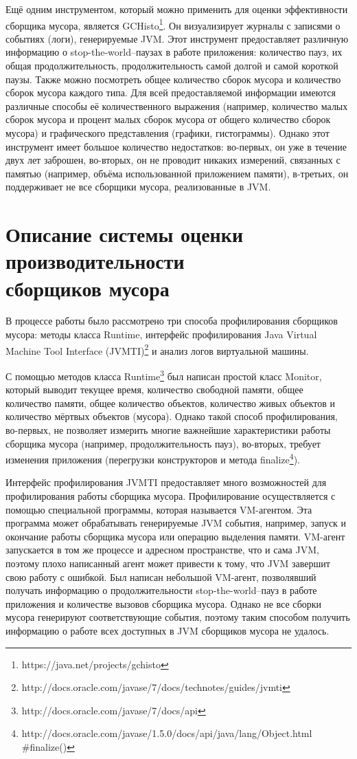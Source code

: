 Ещё одним инструментом, который можно применить для оценки эффективности сборщика мусора,
является GCHisto\footnote{https://java.net/projects/gchisto}. Он визуализирует журналы
с записями о событиях (логи), генерируемые JVM. Этот инструмент предоставляет различную 
информацию о stop-the-world--паузах в работе приложения: количество пауз, их общая продолжительность,
продолжительность самой долгой и самой короткой паузы. Также можно посмотреть общее количество
сборок мусора и количество сборок мусора каждого типа. Для всей предоставляемой информации
имеются различные способы её количественного выражения (например, количество малых сборок мусора
и процент малых сборок мусора от общего количество сборок мусора) и графического представления
(графики, гистограммы). Однако этот инструмент имеет большое количество недостатков:
во-первых, он уже в течение двух лет заброшен, во-вторых, он не проводит никаких
измерений, связанных с памятью (например, объёма использованной приложением памяти), в-третьих,
он поддерживает не все сборщики мусора, реализованные в JVM.

\section{Описание системы оценки производительности\\сборщиков мусора}

В процессе работы было рассмотрено три способа профилирования сборщиков мусора:
методы класса Runtime, интерфейс профилирования Java Virtual Machine Tool Interface
(JVMTI)\footnote{http://docs.oracle.com/javase/7/docs/technotes/guides/jvmti} и анализ
логов виртуальной машины.

С помощью методов класса Runtime\footnote{http://docs.oracle.com/javase/7/docs/api}
был написан простой класс Monitor, который выводит текущее время, количество свободной памяти,
общее количество памяти, общее количество объектов, количество живых объектов и 
количество мёртвых объектов (мусора). Однако такой способ профилирования, во-первых,
не позволяет измерить многие важнейшие характеристики работы сборщика мусора (например, продолжительность
пауз), во-вторых, требует изменения приложения (перегрузки конструкторов и 
метода finalize\footnote{http://docs.oracle.com/javase/1.5.0/docs/api/java/lang/Object.html\\
\#finalize()}).

Интерфейс профилирования JVMTI предоставляет много возможностей для профилирования
работы сборщика мусора. Профилирование осуществляется с помощью специальной программы,
которая называется VM-агентом. Эта программа может обрабатывать генерируемые JVM
события, например, запуск и окончание работы сборщика мусора или операцию выделения
памяти. VM-агент запускается в том же процессе и адресном пространстве, что и сама
JVM, поэтому плохо написанный агент может привести к тому, что JVM завершит свою
работу с ошибкой. Был написан небольшой VM-агент, позволявший получать информацию
о продолжительности stop-the-world--пауз в работе приложения и количестве вызовов сборщика
мусора. Однако не все сборки мусора генерируют соответствующие события, поэтому таким способом получить
информацию о работе всех доступных в JVM сборщиков мусора не удалось.

